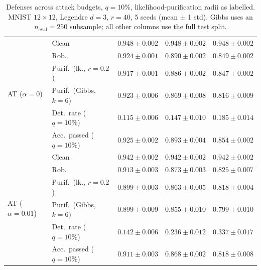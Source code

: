 \begin{table}[htbp]
\begin{tabular}{@{}llrrr@{}}
    \cmidrule(lr){1-5}
    \multirow{6}{*}{AT ($\alpha{=}0$)} & Clean & $0.948 \pm 0.002$ & $0.948 \pm 0.002$ & $0.948 \pm 0.002$ \\
     & Rob. & $\mathbf{0.924 \pm 0.001}$ & $\mathbf{0.890 \pm 0.002}$ & $\mathbf{0.849 \pm 0.002}$ \\
     & Purif.\ (lk., $r{=}0.2$) & $\mathbf{0.917 \pm 0.001}$ & $\mathbf{0.886 \pm 0.002}$ & $\mathbf{0.847 \pm 0.002}$ \\
     & Purif.\ (Gibbs, $k{=}6$) & $\mathbf{0.923 \pm 0.006}$ & $\mathbf{0.869 \pm 0.008}$ & $\mathbf{0.816 \pm 0.009}$ \\
     & Det.\ rate ($q{=}10\%$) & $0.115 \pm 0.006$ & $0.147 \pm 0.010$ & $0.185 \pm 0.014$ \\
     & Acc.\ passed ($q{=}10\%$) & $\mathbf{0.925 \pm 0.002}$ & $\mathbf{0.893 \pm 0.004}$ & $\mathbf{0.854 \pm 0.002}$ \\
    \cmidrule(lr){1-5}
    \multirow{6}{*}{AT ($\alpha{=}0.01$)} & Clean & $0.942 \pm 0.002$ & $0.942 \pm 0.002$ & $0.942 \pm 0.002$ \\
     & Rob. & $0.913 \pm 0.003$ & $0.873 \pm 0.003$ & $0.825 \pm 0.007$ \\
     & Purif.\ (lk., $r{=}0.2$) & $0.899 \pm 0.003$ & $0.863 \pm 0.005$ & $0.818 \pm 0.004$ \\
     & Purif.\ (Gibbs, $k{=}6$) & $0.899 \pm 0.009$ & $0.855 \pm 0.010$ & $0.799 \pm 0.010$ \\
     & Det.\ rate ($q{=}10\%$) & $0.142 \pm 0.006$ & $0.236 \pm 0.012$ & $0.337 \pm 0.017$ \\
     & Acc.\ passed ($q{=}10\%$) & $0.911 \pm 0.003$ & $0.868 \pm 0.002$ & $0.818 \pm 0.008$ \\
    \bottomrule
  \end{tabular}
  \caption{Defenses across attack budgets, $q{=}10\%$, likelihood-purification radii as labelled. MNIST $12\times12$, Legendre $d{=}3$, $r{=}40$, 5 seeds (mean $\pm$ 1 std). Gibbs uses an $n_{\mathrm{eval}}=250$ subsample; all other columns use the full test split.}
  \label{tab:mnist_r12_models_r40}
\end{table}
